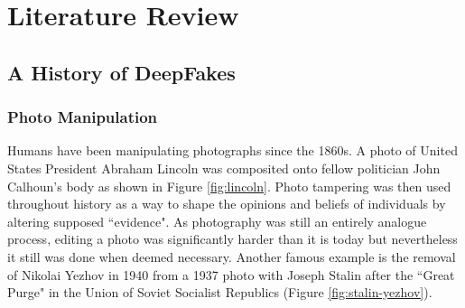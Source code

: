 \chapter{Literature Review}
\label{ch:background}

\section{A History of DeepFakes}


\subsection{Photo Manipulation}

Humans have been manipulating photographs since the 1860s. A photo of United States President Abraham Lincoln was composited onto fellow politician John Calhoun's body\cite{singh2018art} as shown in Figure \ref{fig:lincoln}. Photo tampering was then used throughout history as a way to shape the opinions and beliefs of individuals by altering supposed ``evidence". As photography was still an entirely analogue process, editing a photo was significantly harder than it is today but nevertheless it still was done when deemed necessary. Another famous example is the removal of Nikolai Yezhov in 1940 from a 1937 photo with Joseph Stalin after the ``Great Purge" in the Union of Soviet Socialist Republics (Figure \ref{fig:stalin-yezhov}).

